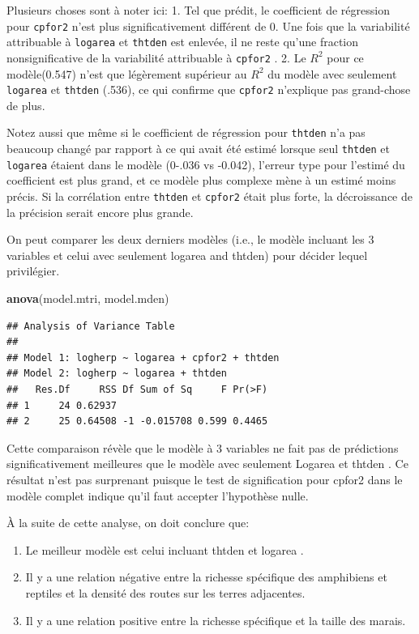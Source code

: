 \documentclass[
  12pt,
]{book}
\newenvironment{Shaded}{\begin{snugshade}}{\end{snugshade}}
\newcommand{\KeywordTok}[1]{\textcolor[rgb]{0.13,0.29,0.53}{\textbf{#1}}}
\newcommand{\NormalTok}[1]{#1}
\providecommand{\tightlist}{%
  \setlength{\itemsep}{0pt}\setlength{\parskip}{0pt}}
\begin{document}
Plusieurs choses sont à noter ici:
1. Tel que prédit, le coefficient de régression pour \texttt{cpfor2} n'est plus significativement différent de 0. Une fois que la variabilité attribuable à \texttt{logarea} et \texttt{thtden} est enlevée, il ne reste qu'une fraction nonsignificative de la variabilité attribuable à \texttt{cpfor2} .
2. Le \(R^2\) pour ce modèle(0.547) n'est que légèrement supérieur au \(R^2\) du modèle avec seulement \texttt{logarea} et \texttt{thtden} (.536), ce qui confirme que \texttt{cpfor2} n'explique pas grand-chose de plus.

Notez aussi que même si le coefficient de régression pour \texttt{thtden} n'a pas beaucoup changé par rapport à ce qui avait été estimé lorsque seul \texttt{thtden} et \texttt{logarea} étaient dans le modèle (0-.036 vs -0.042), l'erreur type pour l'estimé du coefficient est plus grand, et ce modèle plus complexe mène à un estimé moins précis. Si la corrélation entre \texttt{thtden} et \texttt{cpfor2} était plus forte, la décroissance de la précision serait encore plus grande.

On peut comparer les deux derniers modèles (i.e., le modèle incluant les 3 variables et celui avec seulement logarea and thtden) pour décider lequel privilégier.

\begin{Shaded}
\begin{Highlighting}[]
\KeywordTok{anova}\NormalTok{(model.mtri, model.mden)}
\end{Highlighting}
\end{Shaded}

\begin{verbatim}
## Analysis of Variance Table
## 
## Model 1: logherp ~ logarea + cpfor2 + thtden
## Model 2: logherp ~ logarea + thtden
##   Res.Df     RSS Df Sum of Sq     F Pr(>F)
## 1     24 0.62937                          
## 2     25 0.64508 -1 -0.015708 0.599 0.4465
\end{verbatim}

Cette comparaison révèle que le modèle à 3 variables ne fait pas de prédictions significativement meilleures que le modèle avec seulement Logarea et thtden . Ce résultat n'est pas surprenant puisque le test de signification pour cpfor2 dans le modèle complet indique qu'il faut accepter l'hypothèse nulle.

À la suite de cette analyse, on doit conclure que:

\begin{enumerate}
\def\labelenumi{\arabic{enumi}.}
\tightlist
\item
  Le meilleur modèle est celui incluant thtden et logarea .
\item
  Il y a une relation négative entre la richesse spécifique des amphibiens et reptiles et la densité des routes sur les terres adjacentes.
\item
  Il y a une relation positive entre la richesse spécifique et la taille des marais.
\end{enumerate}
\end{document}
